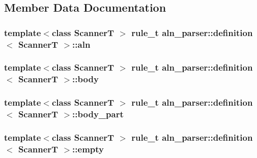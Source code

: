\subsection{Member Data Documentation}
\hypertarget{structaln__parser_1_1definition_ab6919ea9346e2e607e34318f25211534}{
\subsubsection[{aln}]{\setlength{\rightskip}{0pt plus 5cm}template$<$class Scanner\+T $>$ {\bf rule\+\_\+t} {\bf aln\+\_\+parser\+::definition}$<$ Scanner\+T $>$\+::aln}}\label{structaln__parser_1_1definition_ab6919ea9346e2e607e34318f25211534}
\hypertarget{structaln__parser_1_1definition_ae6705116cb940909cda17ea3849c062f}{
\subsubsection[{body}]{\setlength{\rightskip}{0pt plus 5cm}template$<$class Scanner\+T $>$ {\bf rule\+\_\+t} {\bf aln\+\_\+parser\+::definition}$<$ Scanner\+T $>$\+::body}}\label{structaln__parser_1_1definition_ae6705116cb940909cda17ea3849c062f}
\hypertarget{structaln__parser_1_1definition_a64e55f65312e9ed84df5249ea54d45ea}{
\subsubsection[{body\+\_\+part}]{\setlength{\rightskip}{0pt plus 5cm}template$<$class Scanner\+T $>$ {\bf rule\+\_\+t} {\bf aln\+\_\+parser\+::definition}$<$ Scanner\+T $>$\+::body\+\_\+part}}\label{structaln__parser_1_1definition_a64e55f65312e9ed84df5249ea54d45ea}
\hypertarget{structaln__parser_1_1definition_afafdb23081539c09e9e4912b558d8332}{
\subsubsection[{empty}]{\setlength{\rightskip}{0pt plus 5cm}template$<$class Scanner\+T $>$ {\bf rule\+\_\+t} {\bf aln\+\_\+parser\+::definition}$<$ Scanner\+T $>$\+::empty}}\label{structaln__parser_1_1definition_afafdb23081539c09e9e4912b558d8332}
